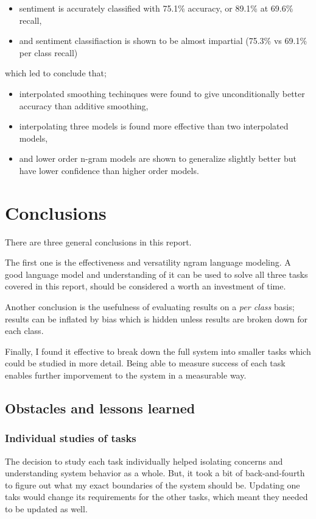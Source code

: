 \documentclass[a4paper,11pt]{kth-mag}
\begin{document}
\begin{itemize}
\item sentiment is accurately classified with 75.1\% accuracy, or 89.1\% at 69.6\% recall,
\item and sentiment classifiaction is shown to be almost impartial (75.3\% vs 69.1\% per class recall)
\end{itemize}
which led to conclude that;
\begin{itemize}
\item interpolated smoothing techinques were found to give unconditionally better accuracy than additive smoothing,
\item interpolating three models is found more effective than two interpolated models,
\item and lower order n-gram models are shown to generalize slightly better but have lower confidence than higher order models.
\end{itemize}

\section{Conclusions}

There are three general conclusions in this report.

The first one is the effectiveness and versatility ngram language modeling.
A good language model and understanding of it can be used to solve all three
tasks covered in this report, should be considered a worth an investment of time.

Another conclusion is the usefulness of evaluating results on a \emph{per class} basis;
results can be inflated by bias which is hidden unless results are broken down for each class.

Finally, I found it effective to break down the full system into smaller tasks which could be studied in more detail.
Being able to measure success of each task enables further imporvement to the system in a measurable way.


\subsection{Obstacles and lessons learned}


\subsubsection{Individual studies of tasks}
The decision to study each task individually helped isolating concerns and understanding system behavior as a whole. But, it took a bit of back-and-fourth to figure out what my exact boundaries of the system should be. Updating one taks would change its requirements for the other tasks, which meant they needed to be updated as well.
\end{document}
